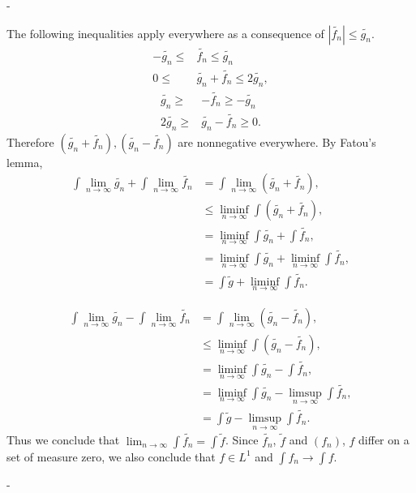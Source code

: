 \documentclass[12pt]{article}
\makeatletter
\theoremstyle{ex215}
\newcounter{probcount}
\newlength\probsep
\newlength\pshrinking
\newenvironment{problems}%
  {\ifhmode\unskip\par\fi\setcounter{probcount}{0}\probsep\parskip
  \sbox\@tempboxa{\textbf{9.}}\pshrinking\wd\@tempboxa\advance\pshrinking\labelsep
  \advance\linewidth -\pshrinking
  \advance\@totalleftmargin\pshrinking
  \advance\leftskip\pshrinking}%
  {\ifhmode\unskip \par\fi\advance\leftskip-\pshrinking}%
\renewenvironment{proof}[1][\proofname]{\par
  \pushQED{\qed}%
  \normalfont \topsep6\p@\@plus6\p@\relax
  \trivlist
  \@topsep \topsep
  \item[\hskip\labelsep
        \itshape
    #1\@addpunct{.}]\ignorespaces
}{%
  \popQED\endtrivlist\@endpefalse
}
\newcommand{\abs}[1]{\left| #1 \right|}
\makeatother
\begin{document}
\begin{problems}
\begin{proof}
      The following inequalities apply everywhere as a consequence of $\abs{\tilde{f_n}} \leq \tilde{g_n}$. 
      \begin{align*}
        -\tilde{g_n} \leq &\tilde{f_n} \leq \tilde{g_n}\\
         0 \leq &\tilde{g_n} + \tilde{f_n} \leq 2\tilde{g_n},
      \end{align*}
        \begin{align*}
          \tilde{g_n} \geq &-\tilde{f_n} \geq -\tilde{g_n}\\
          2\tilde{g_n} \geq & \tilde{g_n}- \tilde{f_n} \geq 0.
        \end{align*}
        Therefore $(\tilde{g_n} + \tilde{f_n}), (\tilde{g_n} - \tilde{f_n})$ are nonnegative everywhere. By Fatou's lemma,
        \begin{align*}
          \int \lim_{n \to \infty} \tilde{g_n} + \int \lim_{n \to \infty} \tilde{f_n} &=  \int \lim_{n \to \infty} (\tilde{g_n} + \tilde{f_n}),\\
          &\leq \liminf_{n \to \infty} \int (\tilde{g_n} + \tilde{f_n}),\\
          &= \liminf_{n \to \infty} \int \tilde{g_n} + \int \tilde{f_n},\\
          &= \liminf_{n \to \infty} \int \tilde{g_n} + \liminf_{n \to \infty} \int \tilde{f_n},\\
          &= \int \tilde{g} + \liminf_{n \to \infty} \int \tilde{f_n}.
        \end{align*}

        \begin{align*}
          \int \lim_{n \to \infty} \tilde{g_n} - \int \lim_{n \to \infty} \tilde{f_n} &=  \int \lim_{n \to \infty} (\tilde{g_n} - \tilde{f_n}),\\
          &\leq \liminf_{n \to \infty} \int (\tilde{g_n} - \tilde{f_n}),\\
          &= \liminf_{n \to \infty} \int \tilde{g_n} - \int \tilde{f_n},\\
          &= \liminf_{n \to \infty} \int \tilde{g_n} - \limsup_{n \to \infty} \int \tilde{f_n},\\
          &= \int \tilde{g} - \limsup_{n \to \infty} \int \tilde{f_n}.
        \end{align*}
        Thus we conclude that $\lim_{n \to \infty} \int \tilde{f_n} = \int \tilde{f}$. Since $\tilde{f_n}$, $\tilde{f}$ and $(f_n)$, $f$ differ on a set of measure zero, we also conclude that $f\in L^1$ and $\int f_n \to \int f$.        
  \end{proof}
  \vspace*{.15in}






\end{problems}
\end{document}
